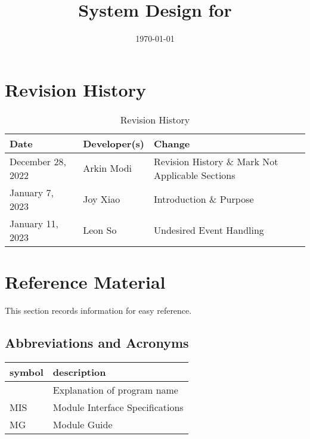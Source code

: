 \documentclass[12pt, titlepage]{article}
\begin{document}
\title{System Design for \progname{}}
\author{\authname}
\date{\today}

\maketitle


\section{Revision History}

\begin{table}[hp]
	\caption{Revision History} \label{TblRevisionHistory}
	\begin{tabularx}{\textwidth}{llX}
		\toprule
		\textbf{Date}     & \textbf{Developer(s)} & \textbf{Change}                                  \\
		\midrule
		December 28, 2022 & Arkin Modi            & Revision History \& Mark Not Applicable Sections \\
		January 7, 2023   & Joy Xiao              & Introduction \& Purpose                          \\
		January 11, 2023  & Leon So               & Undesired Event Handling                         \\
		\bottomrule
	\end{tabularx}
\end{table}

\newpage

\section{Reference Material}

This section records information for easy reference.

\subsection{Abbreviations and Acronyms}

\begin{tabular}{l l}
	\toprule
	\textbf{symbol} & \textbf{description}            \\
	\midrule
	\progname       & Explanation of program name     \\
	MIS             & Module Interface Specifications \\
	MG              & Module Guide                    \\
	\bottomrule
\end{tabular}
\end{document}
